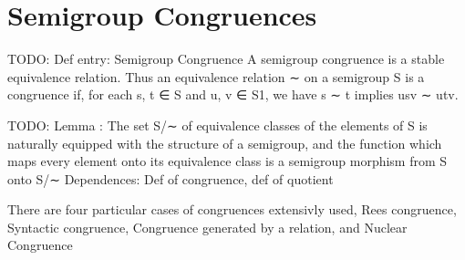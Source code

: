 \section {Semigroup Congruences}

TODO: Def entry: Semigroup Congruence
A semigroup congruence is a stable equivalence relation. Thus an equivalence
relation ∼ on a semigroup S is a congruence if, for each s, t ∈ S and u, v ∈ S1,
we have
s ∼ t implies usv ∼ utv.

TODO: Lemma : The set S/∼ of equivalence classes of the elements of S is naturally equipped
with the structure of a semigroup, and the function which maps every element
onto its equivalence class is a semigroup morphism from S onto S/∼
Dependences: Def of congruence, def of quotient

There are four particular cases of congruences extensivly used, Rees congruence, Syntactic congruence, Congruence 
generated by a relation, and Nuclear Congruence

